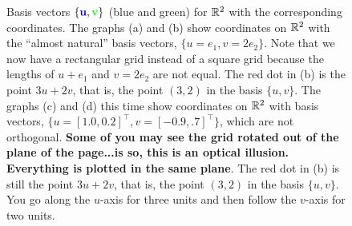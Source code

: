 \begin{figure}[!hb]%
\centering
{}%
\hspace{5pt}%
%
\hspace{5pt}%
\hspace{5pt}%
%
    \caption[]{Basis vectors $\{ \textcolor{blue}{\bf u}, \textcolor{green}{\bf v}\}$ (blue and green) for $\mathbb R^2$ with the corresponding coordinates. The graphs (a) and (b) show coordinates on $\mathbb R^2$ with the ``almost natural'' basis vectors, $\{u=e_1, v=2 e_2 \}$.  Note that we now have a rectangular grid instead of a square grid because the lengths of $u+e_1$ and $v=2 e_2$ are not equal. The red dot in (b) is the point $3 u + 2 v$, that is, the point $(3,2)$ in the basis $\{u, v \}.$  The graphs (c) and (d) this time show coordinates on $\mathbb R^2$ with basis vectors, $\{u=[1.0,  0.2 ]^\top, v= [-0.9, .7]^\top \}$, which are not orthogonal.  \textbf{Some of you may see the grid rotated out of the plane of the page...is so, this is an optical illusion. Everything is plotted in the same plane}. The red dot in (b) is still the point $3 u + 2 v$, that is, the point $(3, 2)$ in the basis $\{u, v \}$.  You go along the $u$-axis for three units and then follow the $v$-axis for two units.
}
\end{figure}
